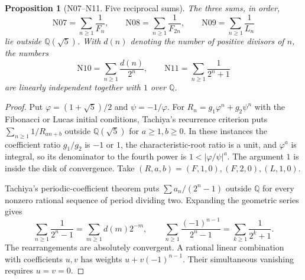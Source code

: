 \documentclass[11pt,a4paper]{article}
\newtheorem{proposition}[theorem]{Proposition}
\theoremstyle{definition}
\theoremstyle{remark}
\begin{document}
\par\hypertarget{cat-N07}{}\label{page:N07}\hypertarget{cat-N08}{}\label{page:N08}\hypertarget{cat-N09}{}\label{page:N09}\hypertarget{cat-N10}{}\label{page:N10}\hypertarget{cat-N11}{}\label{page:N11}
\begin{proposition}[N07--N11. Five reciprocal sums]
The three sums, in order,
\[
 \mathrm{N07}=\sum_{n\ge1}\frac1{F_n},\qquad
 \mathrm{N08}=\sum_{n\ge1}\frac1{F_{2n}},\qquad
 \mathrm{N09}=\sum_{n\ge1}\frac1{L_n}
\]
lie outside $\mathbb Q(\sqrt5)$. With $d(n)$ denoting the number of
positive divisors of $n$, the numbers
\[
 \mathrm{N10}=\sum_{n\ge1}\frac{d(n)}{2^n},\qquad
 \mathrm{N11}=\sum_{n\ge1}\frac{1}{2^n+1}
\]
are linearly independent together with $1$ over $\mathbb Q$.
\end{proposition}
\begin{proof}
Put $\varphi=(1+\sqrt5)/2$ and $\psi=-1/\varphi$.
For $R_n=g_1\varphi^n+g_2\psi^n$ with the Fibonacci or Lucas initial
conditions, Tachiya's recurrence criterion \cite[Cor.~2 and Ex.~2]{nTach}
puts $\sum_{n\ge1}1/R_{an+b}$ outside $\mathbb Q(\sqrt5)$ for
$a\ge1,b\ge0$. In these instances the coefficient ratio $g_1/g_2$ is
$-1$ or $1$, the characteristic-root ratio is a unit, and $\varphi^a$
is integral, so its denominator to the fourth power is $1<|\varphi/\psi|^a$.
The argument $1$ is inside the disk of convergence. Take
$(R,a,b)=(F,1,0),(F,2,0),(L,1,0)$.

Tachiya's periodic-coefficient theorem \cite[Thm.~1]{nTach} puts
$\sum a_n/(2^n-1)$ outside $\mathbb Q$ for every nonzero rational
sequence of period dividing two. Expanding the geometric series gives
\[
 \sum_{n\ge1}\frac1{2^n-1}=\sum_{m\ge1}d(m)2^{-m},\qquad
 \sum_{n\ge1}\frac{(-1)^{n-1}}{2^n-1}=\sum_{k\ge1}\frac1{2^k+1}.
\]
The rearrangements are absolutely convergent. A rational linear
combination with coefficients $u,v$ has weights $u+v(-1)^{n-1}$.
Their simultaneous vanishing requires $u=v=0$.
\end{proof}
\end{document}
